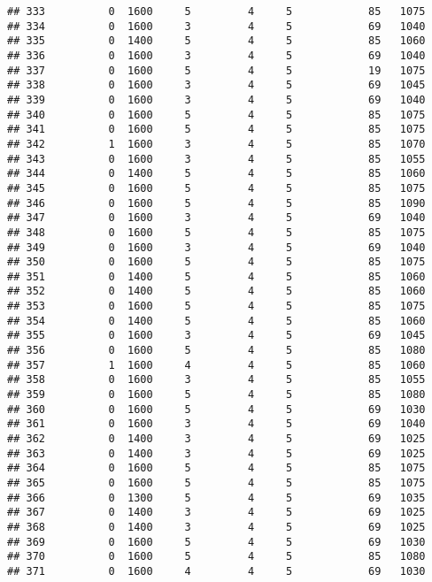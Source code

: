 \documentclass[]{article}
\begin{document}
\begin{verbatim}
## 333          0  1600     5         4     5            85   1075
## 334          0  1600     3         4     5            69   1040
## 335          0  1400     5         4     5            85   1060
## 336          0  1600     3         4     5            69   1040
## 337          0  1600     5         4     5            19   1075
## 338          0  1600     3         4     5            69   1045
## 339          0  1600     3         4     5            69   1040
## 340          0  1600     5         4     5            85   1075
## 341          0  1600     5         4     5            85   1075
## 342          1  1600     3         4     5            85   1070
## 343          0  1600     3         4     5            85   1055
## 344          0  1400     5         4     5            85   1060
## 345          0  1600     5         4     5            85   1075
## 346          0  1600     5         4     5            85   1090
## 347          0  1600     3         4     5            69   1040
## 348          0  1600     5         4     5            85   1075
## 349          0  1600     3         4     5            69   1040
## 350          0  1600     5         4     5            85   1075
## 351          0  1400     5         4     5            85   1060
## 352          0  1400     5         4     5            85   1060
## 353          0  1600     5         4     5            85   1075
## 354          0  1400     5         4     5            85   1060
## 355          0  1600     3         4     5            69   1045
## 356          0  1600     5         4     5            85   1080
## 357          1  1600     4         4     5            85   1060
## 358          0  1600     3         4     5            85   1055
## 359          0  1600     5         4     5            85   1080
## 360          0  1600     5         4     5            69   1030
## 361          0  1600     3         4     5            69   1040
## 362          0  1400     3         4     5            69   1025
## 363          0  1400     3         4     5            69   1025
## 364          0  1600     5         4     5            85   1075
## 365          0  1600     5         4     5            85   1075
## 366          0  1300     5         4     5            69   1035
## 367          0  1400     3         4     5            69   1025
## 368          0  1400     3         4     5            69   1025
## 369          0  1600     5         4     5            69   1030
## 370          0  1600     5         4     5            85   1080
## 371          0  1600     4         4     5            69   1030

\end{verbatim}
\end{document}
